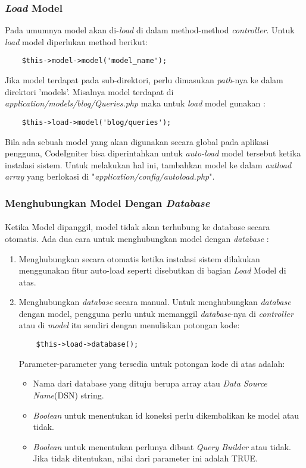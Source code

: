 \subsubsection{\textit{Load} Model}
Pada umumnya model akan di-\textit{load} di dalam method-method \textit{controller}. Untuk \textit{load} model diperlukan method berikut:
\begin{lstlisting}
	$this->model->model('model_name');
\end{lstlisting}
Jika model terdapat pada sub-direktori, perlu dimasukan \textit{path}-nya ke dalam direktori 'models'. Misalnya model terdapat di \textit{application/models/blog/Queries.php} maka untuk \textit{load} model gunakan :
\begin{lstlisting}
	$this->load->model('blog/queries');
\end{lstlisting}
Bila ada sebuah model yang akan digunakan secara global pada aplikasi pengguna, CodeIgniter bisa diperintahkan untuk \textit{auto-load} model tersebut ketika instalasi sistem. Untuk melakukan hal ini, tambahkan model ke dalam \textit{autload array} yang berlokasi di "\textit{application/config/autoload.php}". \cite{CodeIgniter:17}

\subsubsection{Menghubungkan Model Dengan \textit{Database}}
\paragraph{}Ketika Model dipanggil, model tidak akan terhubung ke database secara otomatis. Ada dua cara untuk menghubungkan model dengan \textit{database} : \cite{CodeIgniter:17}
\begin{enumerate}
	\item Menghubungkan secara otomatis ketika instalasi sistem dilakukan menggunakan fitur auto-load seperti disebutkan di bagian \textit{Load} Model di atas.
	\item Menghubungkan \textit{database} secara manual. Untuk menghubungkan \textit{database} dengan model, pengguna perlu untuk memanggil \textit{database}-nya di \textit{controller} atau di \textit{model} itu sendiri dengan menuliskan potongan kode: \cite{CodeIgniter:17}
	\begin{lstlisting}
	$this->load->database();	
	\end{lstlisting}
Parameter-parameter yang tersedia untuk potongan kode di atas adalah:
	\begin{itemize}
	\item Nama dari database yang dituju berupa array atau \textit{Data Source Name}(DSN) string.
	\item \textit{Boolean} untuk menentukan id koneksi perlu dikembalikan ke model atau tidak.
	\item \textit{Boolean} untuk menentukan perlunya dibuat \textit{Query Builder} atau tidak. Jika tidak ditentukan, nilai dari parameter ini adalah TRUE.
	\end{itemize}
\end{enumerate}

